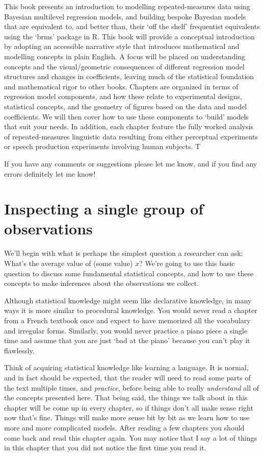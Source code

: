 \documentclass[
]{book}
\begin{document}
This book presents an introduction to modelling repeated-measures data using Bayesian multilevel regression models, and building bespoke Bayesian models that are equivalent to, and better than, their `off the shelf' frequentist equivalents using the `brms' package in R. This book will provide a conceptual introduction by adopting an accessible narrative style that introduces mathematical and modelling concepts in plain English. A focus will be placed on understanding concepts and the visual/geometric consequences of different regression model structures and changes in coefficients, leaving much of the statistical foundation and mathematical rigor to other books. Chapters are organized in terms of regression model components, and how these relate to experimental designs, statistical concepts, and the geometry of figures based on the data and model coefficients. We will then cover how to use these components to `build' models that suit your needs. In addition, each chapter feature the fully worked analysis of repeated-measures linguistic data resulting from either perceptual experiments or speech production experiments involving human subjects. T

If you have any comments or suggestions please let me know, and if you find any errors definitely let me know!

\hypertarget{inspecting-a-single-group-of-observations}{%
\chapter{Inspecting a single group of observations}\label{inspecting-a-single-group-of-observations}}

We'll begin with what is perhaps the simplest question a researcher can ask: What's the average value of (some value) \(x\)? We're going to use this basic question to discuss some fundamental statistical concepts, and how to use these concepts to make inferences about the observations we collect.

Although statistical knowledge might seem like declarative knowledge, in many ways it is more similar to procedural knowledge. You would never read a chapter from a French textbook once and expect to have memorized all the vocabulary and irregular forms. Similarly, you would never practice a piano piece a single time and assume that you are just `bad at the piano' because you can't play it flawlessly.

Think of acquiring statistical knowledge like learning a language. It is normal, and in fact should be expected, that the reader will need to read some parts of the text multiple times, and \emph{practice}, before being able to really \emph{understand} all of the concepts presented here. That being said, the things we talk about in this chapter will be come up in every chapter, so if things don't all make sense right now that's fine. Things will make more sense bit by bit as we learn how to use more and more complicated models. After reading a few chapters you should come back and read this chapter again. You may notice that I say a lot of things in this chapter that you did not notice the first time you read it.
\end{document}
